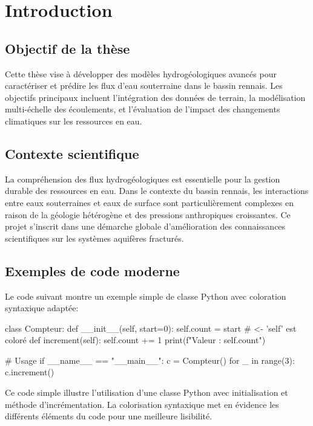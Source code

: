 \chapter{Introduction}

\section{Objectif de la thèse}
Cette thèse vise à développer des modèles hydrogéologiques avancés pour caractériser et prédire les flux d'eau souterraine dans le bassin rennais. Les objectifs principaux incluent l'intégration des données de terrain, la modélisation multi-échelle des écoulements, et l'évaluation de l'impact des changements climatiques sur les ressources en eau.

\section{Contexte scientifique}
La compréhension des flux hydrogéologiques est essentielle pour la gestion durable des ressources en eau. Dans le contexte du bassin rennais, les interactions entre eaux souterraines et eaux de surface sont particulièrement complexes en raison de la géologie hétérogène et des pressions anthropiques croissantes. Ce projet s'inscrit dans une démarche globale d'amélioration des connaissances scientifiques sur les systèmes aquifères fracturés.

\section{Exemples de code moderne}

Le code suivant montre un exemple simple de classe Python avec coloration syntaxique adaptée:

\begin{pythoncode}
class Compteur:
    def __init__(self, start=0):
        self.count = start        # <- 'self' est coloré
    def increment(self):
        self.count += 1
        print(f"Valeur : {self.count}")

# Usage
if __name__ == "__main__":
    c = Compteur()
    for _ in range(3):
        c.increment()
\end{pythoncode}

Ce code simple illustre l'utilisation d'une classe Python avec initialisation et méthode d'incrémentation. La colorisation syntaxique met en évidence les différents éléments du code pour une meilleure lisibilité.